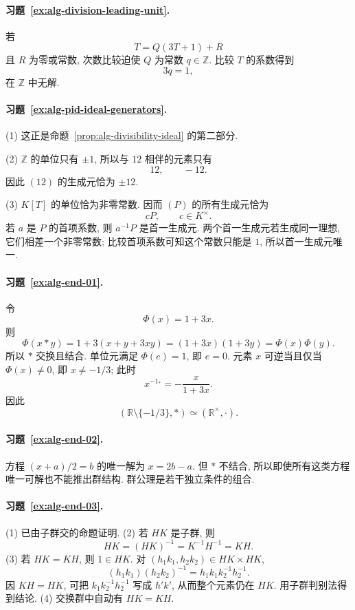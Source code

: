 \documentclass[usesamecnt, thmcnt=section, lang=cn, newtx, 10pt, scheme=chinese]{elegantbook}
\begin{document}
\paragraph*{习题~\ref{ex:alg-division-leading-unit}.}
若
\[
 T=Q(3T+1)+R
\]
且 $R$ 为零或常数, 次数比较迫使 $Q$ 为常数 $q\in\mathbb Z$. 比较 $T$ 的系数得到
\[
 3q=1,
\]
在 $\mathbb Z$ 中无解.

\paragraph*{习题~\ref{ex:alg-pid-ideal-generators}.}
(1) 这正是命题~\ref{prop:alg-divisibility-ideal} 的第二部分.

(2) $\mathbb Z$ 的单位只有 $\pm1$, 所以与 $12$ 相伴的元素只有
\[
 12,\qquad -12.
\]
因此 $(12)$ 的生成元恰为 $\pm12$.

(3) $K[T]$ 的单位恰为非零常数. 因而 $(P)$ 的所有生成元恰为
\[
 cP,\qquad c\in K^\times.
\]
若 $a$ 是 $P$ 的首项系数, 则 $a^{-1}P$ 是首一生成元. 两个首一生成元若生成同一理想, 它们相差一个非零常数; 比较首项系数可知这个常数只能是 $1$, 所以首一生成元唯一.

\paragraph*{习题~\ref{ex:alg-end-01}.}
令
\[
 \Phi(x)=1+3x.
\]
则
\[
 \Phi(x*y)=1+3(x+y+3xy)=(1+3x)(1+3y)=\Phi(x)\Phi(y).
\]
所以 $*$ 交换且结合. 单位元满足 $\Phi(e)=1$, 即 $e=0$. 元素 $x$ 可逆当且仅当 $\Phi(x)\neq0$, 即 $x\neq-1/3$; 此时
\[
 x^{-1_*}=-\frac{x}{1+3x}.
\]
因此
\[
 (\mathbb R\setminus\{-1/3\},*)\simeq(\mathbb R^\times,\cdot).
\]

\paragraph*{习题~\ref{ex:alg-end-02}.}
方程 $(x+a)/2=b$ 的唯一解为 $x=2b-a$. 但 $*$ 不结合, 所以即使所有这类方程唯一可解也不能推出群结构. 群公理是若干独立条件的组合.

\paragraph*{习题~\ref{ex:alg-end-03}.}
(1) 已由子群交的命题证明. (2) 若 $HK$ 是子群, 则
\[
 HK=(HK)^{-1}=K^{-1}H^{-1}=KH.
\]
(3) 若 $HK=KH$, 则 $1\in HK$. 对 $(h_1k_1,h_2k_2)\in HK\times HK$,
\[
 (h_1k_1)(h_2k_2)^{-1}=h_1k_1k_2^{-1}h_2^{-1}.
\]
因 $KH=HK$, 可把 $k_1k_2^{-1}h_2^{-1}$ 写成 $h'k'$, 从而整个元素仍在 $HK$. 用子群判别法得到结论. (4) 交换群中自动有 $HK=KH$.
\end{document}
